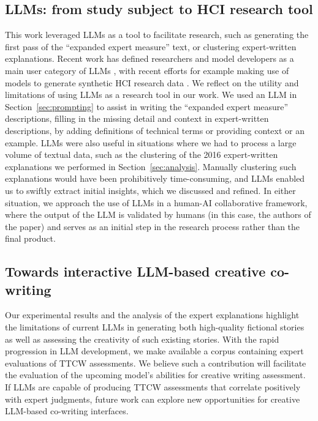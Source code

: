 \subsection{LLMs: from study subject to HCI research tool}

This work leveraged LLMs as a tool to facilitate research, such as generating the first pass of the ``expanded expert measure'' text, or clustering expert-written explanations. Recent work has defined researchers and model developers as a main user category of LLMs \cite{chen2023next}, with recent efforts for example making use of models to generate synthetic HCI research data \cite{hamalainen2023evaluating}. We reflect on the utility and limitations of using LLMs as a research tool in our work. We used an LLM in Section~\ref{sec:prompting} to assist in writing the ``expanded expert measure'' descriptions, filling in the missing detail and context in expert-written descriptions, by adding definitions of technical terms or providing context or an example. LLMs were also useful in situations where we had to process a large volume of textual data, such as the clustering of the 2016 expert-written explanations we performed in Section~\ref{sec:analysis}. Manually clustering such explanations would have been prohibitively time-consuming, and LLMs enabled us to swiftly extract initial insights, which we discussed and refined. In either situation, we approach the use of LLMs in a human-AI collaborative framework, where the output of the LLM is validated by humans (in this case, the authors of the paper) and serves as an initial step in the research process rather than the final product.

\subsection{Towards interactive LLM-based creative co-writing} 
Our experimental results and the analysis of the expert explanations highlight the limitations of current LLMs in generating both high-quality fictional stories as well as assessing the creativity of such existing stories. With the rapid progression in LLM development, we make available a corpus containing expert evaluations of TTCW assessments. We believe such a contribution will facilitate the evaluation of the upcoming model's abilities for creative writing assessment. If LLMs are capable of producing TTCW assessments that correlate positively with expert judgments, future work can explore new opportunities for creative LLM-based co-writing interfaces.


